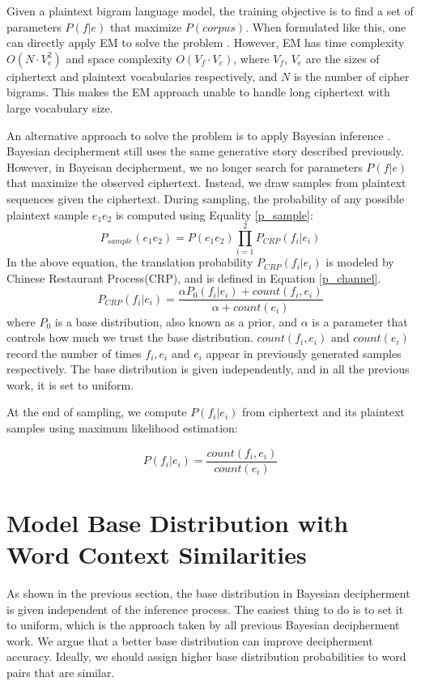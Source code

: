 Given a plaintext bigram language model, the training objective is to find a set of parameters $P(f|e)$ that maximize $P(corpus)$. When formulated like this, one can directly apply EM to solve the problem \cite{knight-EtAl:2006}. However, EM has time complexity $O( N\cdot V_{e}^{2})$ and space complexity $O(V_{f}\cdot V_{e})$, where $V_{f}$, $V_{e}$ are the sizes of ciphertext and plaintext vocabularies respectively, and $N$ is the number of cipher bigrams. This makes the EM approach unable to handle long ciphertext with large vocabulary size. 

An alternative approach to solve the problem is to apply Bayesian inference \cite{ravi-knight:2011,Dou:2012}. Bayesian decipherment still uses the same generative story described previously. However, in Bayeisan decipherment, we no longer search for parameters $P(f|e)$ that maximize the observed ciphertext. Instead, we draw samples from plaintext sequences given the ciphertext. During sampling, the probability of any possible plaintext sample $e_{1}e_{2}$ is computed using Equality \ref{p_sample}:
%
\[
\label{p_sample}
P_{sample}(e_{1}e_{2}) =  P(e_{1}e_{2}) \prod_{i=1}^{2}P_{CRP}(f_{i}|e_{i})
\]
%
In the above equation, the translation probability $P_{CRP}(f_{i}|e_{i})$ is modeled by Chinese Restaurant Process(CRP), and is defined in Equation \ref{p_channel}.
%
\[
\label{p_channel}
P_{CRP}(f_{i}|e_{i}) = \frac{\alpha P_0(f_{i}|e_{i})+count(f_{i},e_{i})}{\alpha+count(e_{i})}
\]
%
where $P_{0}$ is a base distribution, also known as a prior, and $\alpha$ is a parameter that controls how much we trust the base distribution. $count(f_{i},e_{i})$ and $count(e_{i})$ record the number of times $f_{i},e_{i}$ and $e_{i}$ appear in previously generated samples respectively. The base distribution is given independently, and in all the previous work, it is set to uniform.

At the end of sampling, we compute $P(f_{i}|e_{i})$ from ciphertext and its plaintext samples using maximum likelihood estimation:

\[
\label{mlh_estimation}
P(f_{i}|e_{i}) =  \frac{count(f_{i},e_{i})}{count(e_{i})}
\]

\section{Model Base Distribution with Word Context Similarities}
As shown in the previous section, the base distribution in Bayesian decipherment is given independent of the inference process. The easiest thing to do is to set it to uniform, which is the approach taken by all previous Bayesian decipherment work. We argue that a better base distribution can improve decipherment accuracy. Ideally, we should assign higher base distribution probabilities to word pairs that are similar.

